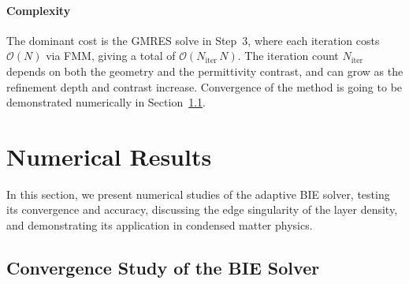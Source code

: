 \documentclass[preprint,12pt]{elsarticle}
\begin{document}


\paragraph{Complexity}
The dominant cost is the GMRES solve in Step~3, where each iteration costs $\mathcal{O}(N)$ via FMM, giving a total of $\mathcal{O}(N_{\mathrm{iter}}\,N)$.
The iteration count $N_{\mathrm{iter}}$ depends on both the geometry and the permittivity contrast, and can grow as the refinement depth and contrast increase.
Convergence of the method is going to be demonstrated numerically in Section~\ref{sec:convergence}.

\section{Numerical Results}\label{sec:numerical_results}

In this section, we present numerical studies of the adaptive BIE solver, testing its convergence and accuracy, discussing the edge singularity of the layer density, and demonstrating its application in condensed matter physics.

\subsection{Convergence Study of the BIE Solver}\label{sec:convergence}
\end{document}

